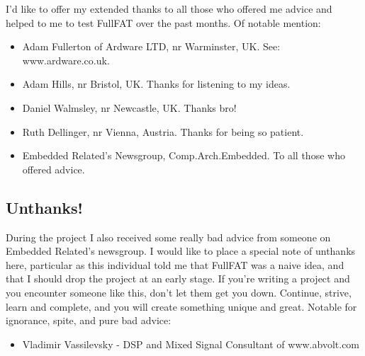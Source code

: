 I'd like to offer my extended thanks to all those who offered me advice and helped to me to test FullFAT over the past months.
\newline
\newline
Of notable mention:
\begin{itemize}
\item Adam Fullerton of Ardware LTD, nr Warminster, UK. See: www.ardware.co.uk.
\item Adam Hills, nr Bristol, UK. Thanks for listening to my ideas.
\item Daniel Walmsley, nr Newcastle, UK. Thanks bro!
\item Ruth Dellinger, nr Vienna, Austria. Thanks for being so patient.
\item Embedded Related's Newsgroup, Comp.Arch.Embedded. To all those who offered advice.
\end{itemize}

\subsection{Unthanks!}
During the project I also received some really bad advice from someone on Embedded Related's newsgroup. I would like to place a special note of unthanks here, particular as this individual told me that FullFAT was a naive idea, and that I should drop the project at an early stage.
\newline
If you're writing a project and you encounter someone like this, don't let them get you down. Continue, strive, learn and complete, and you will create something unique and great.
\newline
\newline
Notable for ignorance, spite, and pure bad advice:
\begin{itemize}
\item Vladimir Vassilevsky - DSP and Mixed Signal Consultant of www.abvolt.com
\end{itemize}
